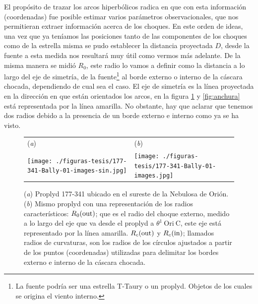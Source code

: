 El propósito de trazar los arcos hiperbólicos radica en  que con esta información (coordenadas) fue posible estimar varios parámetros observacionales, que nos permitieran extraer información acerca de los choques. En este orden de ideas, una vez que ya teníamos las posiciones tanto de las componentes de los choques como de la estrella misma se pudo establecer la distancia proyectada \(D\), desde la fuente a \thC{} esta medida nos resultará muy útil como vermos más adelante. De la misma manera se midió \(R_{0}\), este radio lo vamos a definir como la distancia a lo largo del eje de simetría, de la fuente\footnote{La fuente podría ser una estrella T-Taury o un proplyd. Objetos de los cuales se origina el viento interno.} \citep{Robberto:2005}  al borde externo o interno de la cáscara chocada, dependiendo de cual sea el caso. El eje de simetría es la línea proyectada en la dirección en que están orientados los arcos, en la figura \ref{fig:radios} y \ref{fig:anchura} está representada por la línea amarilla. No obstante, hay que aclarar que tenemos dos radios debido a la presencia de un borde externo e interno como ya se ha visto. \\ 

\begin{figure}[htp]
\centering
\begin{tabular}{l l}
(\textit{a}) & (\textit{b})  \\
  \texttt{[image: ./figuras-tesis/177-341-Bally-01-images-sin.jpg]}&
 \texttt{[image: ./figuras-tesis/177-341-Bally-01-images.jpg]}\\
\end{tabular}
\caption{(\textit{a}) Proplyd 177-341 ubicado en el sureste de la Nebulosa de Orión. (\textit{b}) Mismo proplyd con una representación de los radios característicos: \(R_{0}(\mathrm{out}{})\); que es el radio del choque externo, medido a lo largo del eje que va desde el proplyd a \(\theta^1\ \text{Ori}\ \text{C}\), este eje está representado por la línea amarilla. \(R_{c}(\mathrm{out}{})\) y \(R_{c}(\mathrm{in}{})\); llamados radios de curvaturas, son los radios de los círculos ajustados a partir de los puntos (coordenadas) utilizadas para delimitar los bordes externo e interno de la cáscara chocada. }\label{fig:radios}
\end{figure}

